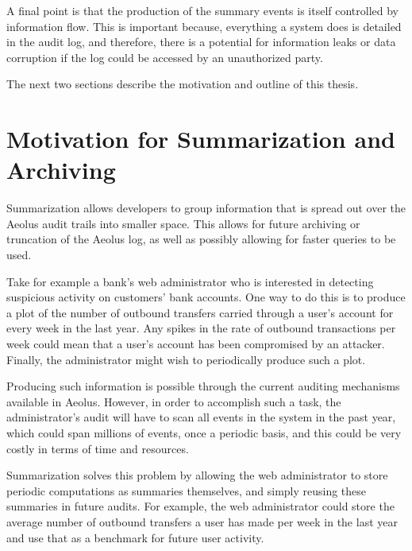 A final point is that the production of the summary events is itself controlled by information flow.  This is important because, everything a system does is detailed in the audit log, and therefore, there is a potential for information leaks or data corruption if the log could be accessed by an unauthorized party.

The next two sections describe the motivation and outline of this thesis.

\section{Motivation for Summarization and Archiving}

Summarization allows developers to group information that is spread out over the Aeolus audit trails into smaller space. This allows for future archiving or truncation of the Aeolus log, as well as possibly allowing for faster queries to be used.

Take for example a bank's web administrator who is interested in detecting suspicious activity on customers' bank accounts. One way to do this is to produce a plot of the number of outbound transfers carried through a user's account for every week in the last year. Any spikes in the rate of outbound transactions per week could mean that a user's account has been compromised by an attacker. Finally, the administrator might wish to periodically produce such a plot.

Producing such information is possible through the current auditing mechanisms available in Aeolus. However, in order to accomplish such a task, the administrator's audit will have to scan all events in the system in the past year, which could span millions of events, once a periodic basis, and this could be very costly in terms of time and resources.

Summarization solves this problem by allowing the web administrator to store periodic computations as summaries themselves, and simply reusing these summaries in future audits. For example, the web administrator could store the average number of outbound transfers a user has made per week in the last year and use that as a benchmark for future user activity.

